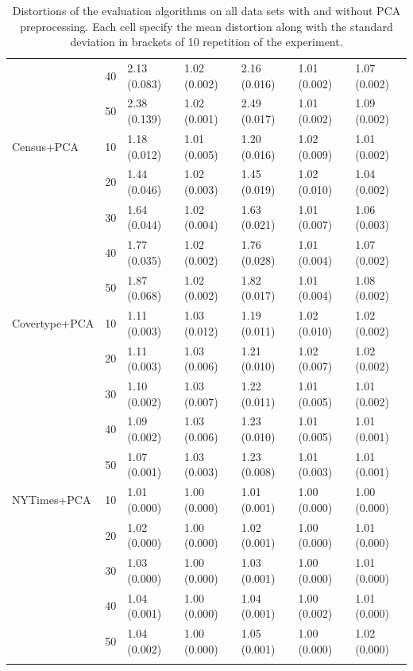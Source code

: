 \begin{longtable}{p{}llllll}
      & 40  &   2.13 (0.083) &   1.02 (0.002) &   2.16 (0.016) &         1.01 (0.002) &  1.07 (0.002) \\
      & 50  &   2.38 (0.139) &   1.02 (0.001) &   2.49 (0.017) &         1.01 (0.002) &  1.09 (0.002) \\
\midrule
Census+PCA & 10  &   1.18 (0.012) &   1.01 (0.005) &   1.20 (0.016) &         1.02 (0.009) &  1.01 (0.002) \\
      & 20  &   1.44 (0.046) &   1.02 (0.003) &   1.45 (0.019) &         1.02 (0.010) &  1.04 (0.002) \\
      & 30  &   1.64 (0.044) &   1.02 (0.004) &   1.63 (0.021) &         1.01 (0.007) &  1.06 (0.003) \\
      & 40  &   1.77 (0.035) &   1.02 (0.002) &   1.76 (0.028) &         1.01 (0.004) &  1.07 (0.002) \\
      & 50  &   1.87 (0.068) &   1.02 (0.002) &   1.82 (0.017) &         1.01 (0.004) &  1.08 (0.002) \\
\midrule
Covertype+PCA & 10  &   1.11 (0.003) &   1.03 (0.012) &   1.19 (0.011) &         1.02 (0.010) &  1.02 (0.002) \\
      & 20  &   1.11 (0.003) &   1.03 (0.006) &   1.21 (0.010) &         1.02 (0.007) &  1.02 (0.002) \\
      & 30  &   1.10 (0.002) &   1.03 (0.007) &   1.22 (0.011) &         1.01 (0.005) &  1.01 (0.002) \\
      & 40  &   1.09 (0.002) &   1.03 (0.006) &   1.23 (0.010) &         1.01 (0.005) &  1.01 (0.001) \\
      & 50  &   1.07 (0.001) &   1.03 (0.003) &   1.23 (0.008) &         1.01 (0.003) &  1.01 (0.001) \\
\midrule
NYTimes+PCA & 10  &   1.01 (0.000) &   1.00 (0.000) &   1.01 (0.001) &         1.00 (0.000) &  1.00 (0.000) \\
      & 20  &   1.02 (0.000) &   1.00 (0.000) &   1.02 (0.001) &         1.00 (0.000) &  1.01 (0.000) \\
      & 30  &   1.03 (0.000) &   1.00 (0.000) &   1.03 (0.001) &         1.00 (0.000) &  1.01 (0.000) \\
      & 40  &   1.04 (0.001) &   1.00 (0.000) &   1.04 (0.001) &         1.00 (0.002) &  1.01 (0.000) \\
      & 50  &   1.04 (0.002) &   1.00 (0.000) &   1.05 (0.001) &         1.00 (0.000) &  1.02 (0.000) \\
\bottomrule
\caption{Distortions of the evaluation algorithms on all data sets with and without PCA preprocessing. Each cell specify the mean distortion along with the standard deviation in brackets of 10 repetition of the experiment.}
\label{tab:distortions-mean-std}
\end{longtable}











